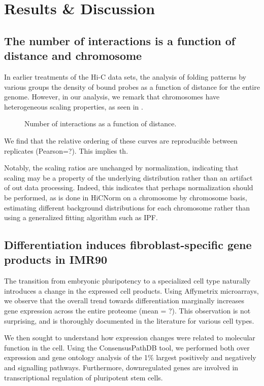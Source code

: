 
\chapter{Results \& Discussion}

\section*{The number of interactions is a function of distance and chromosome}
In earlier treatments of the Hi-C data sets, the analysis of folding patterns by various groups\cite{imakaev2009}\cite{ren2012}
the density of bound probes as a function of distance for the entire genome.  However, in our analysis, we remark that chromosomes
have heterogeneous scaling properties, as seen in .  

\begin{figure}[ht]
  \caption{Number of interactions as a function of distance.}
\end{figure}

We find that the relative ordering of these curves are reproducible between replicates (Pearson=?).  This implies th.

Notably, the scaling ratios are unchanged by normalization, indicating that scaling may be a property of the underlying distribution
rather than an artifact of out data processing.  Indeed, this indicates that perhaps normalization should be performed, as is
done in HiCNorm\cite{} on a chromosome by chromosome basis, estimating different background distributions for each chromosome
rather than using a generalized fitting algorithm such as IPF.


\section*{Differentiation induces fibroblast-specific gene products in IMR90}

The transition from embryonic pluripotency to a specialized cell type naturally introduces a change in the expressed cell products.
Using Affymetrix microarrays, we observe that the overall trend towards differentiation marginally increases gene expression across
the entire proteome (mean = ?).  This observation is not surprising, and is thoroughly documented in the literature\cite{tuomela2012}
for various cell types.

We then sought to understand how expression changes were related to molecular function in the cell.  Using the ConsensusPathDB
tool\cite{kamburov2012}, we performed both over expression and gene ontology analysis of the 1\%  largest positively and negatively
and signalling pathways.  Furthermore, downregulated genes are involved in transcriptional regulation of pluripotent stem cells.

